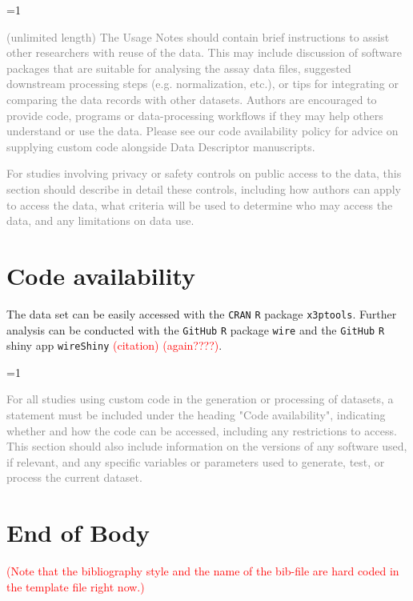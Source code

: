 \documentclass[fleqn,10pt]{wlscirep}
\newcommand{\ifinstruction}{1} %
\begin{document}
\ifnum \ifinstruction=1

\textcolor{gray}{(unlimited length) The Usage Notes should contain brief instructions to assist other researchers with reuse of the data. This may include discussion of software packages that are suitable for analysing the assay data files, suggested downstream processing steps (e.g. normalization, etc.), or tips for integrating or comparing the data records with other datasets. Authors are encouraged to provide code, programs or data-processing workflows if they may help others understand or use the data. Please see our code availability policy for advice on supplying custom code alongside Data Descriptor manuscripts.}

\textcolor{gray}{For studies involving privacy or safety controls on public access to the data, this section should describe in detail these controls, including how authors can apply to access the data, what criteria will be used to determine who may access the data, and any limitations on data use.}
\fi

\section*{Code availability}

The data set can be easily accessed with the \texttt{CRAN} \texttt{R}
package \texttt{x3ptools}. Further analysis can be conducted with the
\texttt{GitHub} \texttt{R} package \texttt{wire} and the \texttt{GitHub}
\texttt{R} shiny app \texttt{wireShiny} \textcolor{red}{(citation)}
\textcolor{red}{(again????)}.

\ifnum \ifinstruction=1

\textcolor{gray}{For all studies using custom code in the generation or processing of datasets, a statement must be included under the heading "Code availability", indicating whether and how the code can be accessed, including any restrictions to access. This section should also include information on the versions of any software used, if relevant, and any specific variables or parameters used to generate, test, or process the current dataset.}
\fi

\section{End of Body}\label{end-of-body}

\textcolor{red}{(Note that the bibliography style and the name of the bib-file are hard coded in the template file right now.)}
\end{document}
